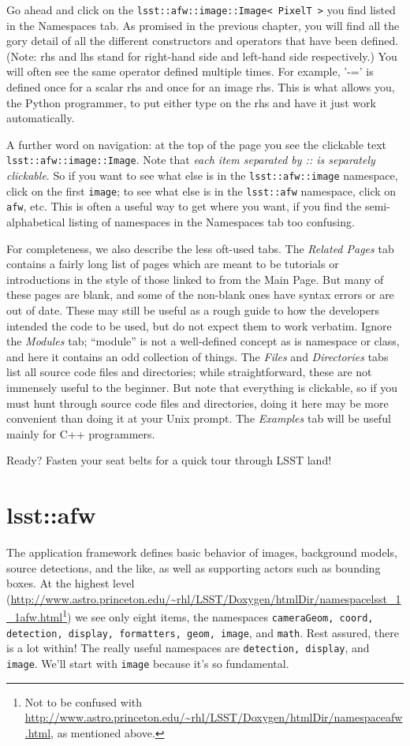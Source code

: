 Go ahead and click on the \texttt{lsst::afw::image::Image< PixelT >}
you find listed in the Namespaces tab.  As promised in the previous
chapter, you will find all the gory detail of all the different
constructors and operators that have been defined.  (Note: rhs and lhs
stand for right-hand side and left-hand side respectively.)  You will
often see the same operator defined multiple times.  For example, '-='
is defined once for a scalar rhs and once for an image rhs.  This is
what allows you, the Python programmer, to put either type on the rhs
and have it just work automatically.

A further word on navigation: at the top of the page you see the
clickable text \texttt{lsst::afw::image::Image}.  Note that {\it each
  item separated by :: is separately clickable}.  So if you want to
see what else is in the \texttt{lsst::afw::image} namespace, click on
the first \texttt{image}; to see what else is in the
\texttt{lsst::afw} namespace, click on \texttt{afw}, etc.  This is
often a useful way to get where you want, if you find the
semi-alphabetical listing of namespaces in the Namespaces tab too
confusing.

For completeness, we also describe the less oft-used tabs.  The {\it
  Related Pages} tab contains a fairly long list of pages which are
meant to be tutorials or introductions in the style of those linked to
from the Main Page.  But many of these pages are blank, and some of
the non-blank ones have syntax errors or are out of date.  These may
still be useful as a rough guide to how the developers intended the
code to be used, but do not expect them to work verbatim.  Ignore the
{\it Modules} tab; ``module'' is not a well-defined concept as is
namespace or class, and here it contains an odd collection of things.
The {\it Files} and {\it Directories} tabs list all source code files and
directories; while straightforward, these are not immensely useful to
the beginner.  But note that everything is clickable, so if you must
hunt through source code files and directories, doing it here may be
more convenient than doing it at your Unix prompt.  The {\it Examples}
tab will be useful mainly for C++ programmers.

Ready?  Fasten your seat belts for a quick tour through LSST land!

\section{lsst::afw}

The application framework defines basic behavior of images, background
models, source detections, and the like, as well as supporting actors
such as bounding boxes. At the highest level (\url{http://www.astro.princeton.edu/~rhl/LSST/Doxygen/htmlDir/namespacelsst_1_1afw.html}\footnote{Not
  to be confused with
  \url{http://www.astro.princeton.edu/~rhl/LSST/Doxygen/htmlDir/namespaceafw.html},
  as mentioned above.}) we see only eight items, the namespaces
\texttt{cameraGeom, coord, detection, display, formatters, geom,
  image}, and \texttt{math}.  Rest assured, there is a lot within!
The really useful namespaces are \texttt{detection, display}, and
\texttt{image}.  We'll start with \texttt{image} because it's so
fundamental.

